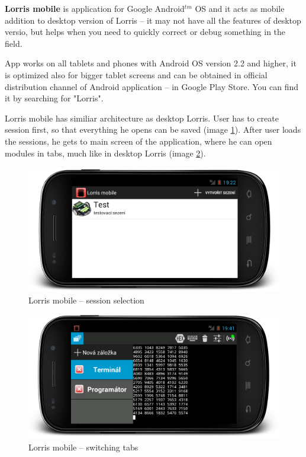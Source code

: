 \documentclass[12pt, a4paper, oneside]{article}
\begin{document}
{\bf Lorris mobile} is application for Google Android$^{tm}$ OS and it acts as mobile addition to desktop version of Lorris -- it may not have all the features of desktop versio, but helps when you need to quickly correct or debug something in the field.

App works on all tablets and phones with Android OS version 2.2 and higher, it is optimized also for bigger tablet screens and can be obtained in official distribution channel of Android application -- in Google Play Store\cite{gplay}. You can find it by searching for "Lorris".

Lorris mobile has similiar architecture as desktop Lorris. User has to create session first, so that everything he opens can be saved (image \ref{mobile_session}). After user loads the sessions, he gets to main screen of the application, where he can open modules in tabs, much like in desktop Lorris (image \ref{mobile_tabs}).

\begin{figure}[H]
\begin{center}
\includegraphics[width=\textwidth]{img/mobile_session.png}
\caption{Lorris mobile -- session selection}
\label{mobile_session}
\end{center}
\end{figure}
\begin{figure}[H]
\begin{center}
\includegraphics[width=\textwidth]{img/mobile_tabs.png}
\caption{Lorris mobile -- switching tabs}
\label{mobile_tabs}
\end{center}
\end{figure}
\end{document}
